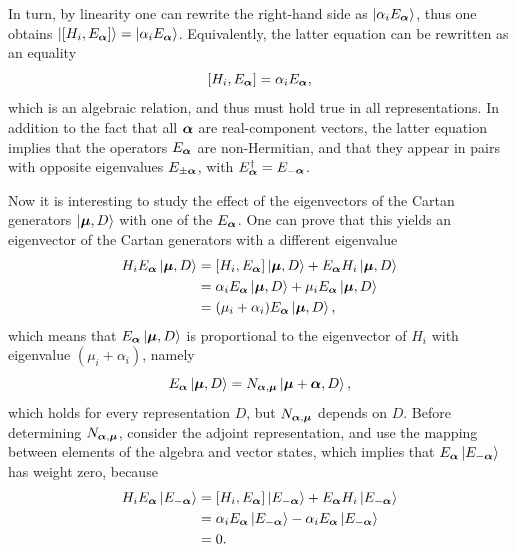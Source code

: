 In turn, by linearity one can rewrite the right-hand side as $\ket{\alpha_i E_{\bm{\alpha}}}$, thus one obtains $\ket{[H_i,E_{\bm{\alpha}}]} = \ket{\alpha_iE_{\bm{\alpha}}}$. Equivalently, the latter equation can be rewritten as an equality 
\begin{equation}
    [H_i,E_{\bm{\alpha}}] = \alpha_i E_{\bm{\alpha}},
\end{equation}
which is an algebraic relation, and thus must hold true in all representations. In addition to the fact that all $\bm{\alpha}$ are real-component vectors, the latter equation implies that the operators $E_{\bm{\alpha}}$ are non-Hermitian, and that they appear in pairs with opposite eigenvalues $E_{\pm\bm{\alpha}}$, with $E_{\bm{\alpha}}^\dagger = E_{-\bm{\alpha}}$.

Now it is interesting to study the effect of the eigenvectors of the Cartan generators $\ket{\bm{\mu},D}$ with one of the $E_{\bm{\alpha}}$. One can prove that this yields an eigenvector of the Cartan generators with a different eigenvalue
\begin{equation}
    \begin{split}
        H_iE_{\bm{\alpha}}\ket{\bm{\mu},D} &= [H_i,E_{\bm{\alpha}}]\ket{\bm{\mu},D} + E_{\bm{\alpha}}H_i\ket{\bm{\mu},D} \\
        &= \alpha_iE_{\bm{\alpha}}\ket{\bm{\mu},D} + \mu_iE_{\bm{\alpha}}\ket{\bm{\mu},D} \\
        &= (\mu_i + \alpha_i)E_{\bm{\alpha}}\ket{\bm{\mu},D},
    \end{split}
\end{equation}
which means that $E_{\bm{\alpha}}\ket{\bm{\mu},D}$ is proportional to the eigenvector of $H_i$ with eigenvalue $(\mu_i + \alpha_i)$, namely
\begin{equation}
\label{eq: Ea on an eigenvector of Hi}
    E_{\bm{\alpha}}\ket{\bm{\mu},D} = N_{\bm{\alpha},\bm{\mu}}\ket{\bm{\mu} + \bm{\alpha},D},
\end{equation}
which holds for every representation $D$, but $N_{\bm{\alpha},\bm{\mu}}$ depends on $D$. Before determining $N_{\bm{\alpha},\bm{\mu}}$, consider the adjoint representation, and use the mapping between elements of the algebra and vector states, which implies that $E_{\bm{\alpha}}\ket{E_{-\bm{\alpha}}}$ has weight zero, because
\begin{equation}
    \begin{split}
        H_iE_{\bm{\alpha}}\ket{E_{-\bm{\alpha}}} &= [H_i,E_{\bm{\alpha}}]\ket{E_{-\bm{\alpha}}} + E_{\bm{\alpha}}H_i\ket{E_{-\bm{\alpha}}} \\
        &= \alpha_iE_{\bm{\alpha}}\ket{E_{-\bm{\alpha}}} - \alpha_iE_{\bm{\alpha}}\ket{E_{-\bm{\alpha}}} \\
        &= 0.
    \end{split}
\end{equation}
